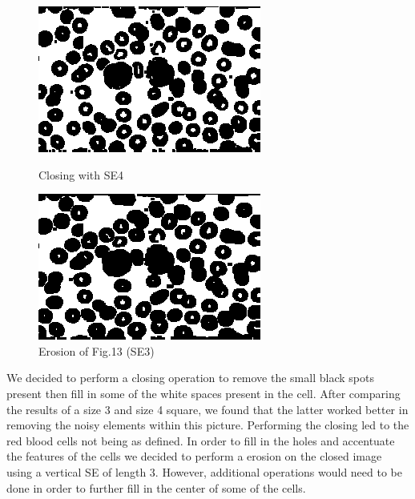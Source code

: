 \documentclass{article}
\begin{document}
\begin{figure}[ht] 
  \label{ fig7} 
  \begin{minipage}[b]{0.5\linewidth}
    \centering
    \includegraphics[width=.97\linewidth]{c_redbloodse4.png} 
    \caption{Closing with SE4} 
    \vspace{4ex}
  \end{minipage}%
  \begin{minipage}[b]{0.5\linewidth}
    \centering
    \includegraphics[width=.97\linewidth]{e_closedredbloodse3.png} 
    \caption{Erosion of Fig.13 (SE3)} 
    \vspace{4ex}
  \end{minipage} 
\end{figure} 

\begin{flushleft}
We decided to perform a closing operation to remove the small black spots present then fill in some of the white spaces present in the cell. After comparing the results of a size 3 and size 4 square, we found that the latter worked better in removing the noisy elements within this picture. \newline
Performing the closing led to the red blood cells not being as defined. In order to fill in the holes and accentuate the features of the cells we decided to perform a erosion on the closed image using a vertical SE of length 3. \newline
However, additional operations would need to be done in order to further fill in the center of some of the cells. 
\end{flushleft}
\end{document}
